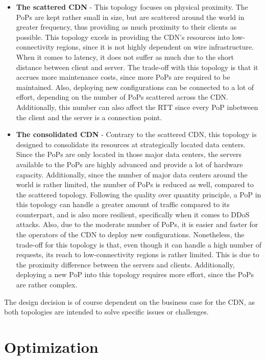 \begin{itemize}
	\item \textbf{The scattered CDN} - This topology focuses on physical proximity. The PoPs are kept rather small in size, but are scattered around the world in greater frequency, thus providing as much proximity to their clients as possible. This topology excels in providing the CDN's resources into low-connectivity regions, since it is not highly dependent on wire infrastructure. When it comes to latency, it does not suffer as much due to the short distance between client and server. The trade-off with this topology is that it accrues more maintenance costs, since more PoPs are required to be maintained. Also, deploying new configurations can be connected to a lot of effort, depending on the number of PoPs scattered across the CDN. 
	Additionally, this number can also affect the RTT since every PoP inbetween the client and the server is a connection point.
	
	\item \textbf{The consolidated CDN} - Contrary to the scattered CDN, this topology is designed to consolidate its resources at strategically located data centers. Since the PoPs are only located in those major data centers, the servers available to the PoPs are highly advanced and provide a lot of hardware capacity. Additionally, since the number of major data centers around the world is rather limited, the number of PoPs is reduced as well, compared to the scattered topology. Following the quality over quantity principle, a PoP in this topology can handle a greater amount of traffic compared to its counterpart, and is also more resilient, specifically when it comes to DDoS attacks. Also, due to the moderate number of PoPs, it is easier and faster for the operators of the CDN to deploy new configurations.
	Nonetheless, the trade-off for this topology is that, even though it can handle a high number of requests, its reach to low-connectivity regions is rather limited. This is due to the proximity difference between the servers and clients. Additionally, deploying a new PoP into this topology requires more effort, since the PoPs are rather complex.	
\end{itemize}

The design decision is of course dependent on the business case for the CDN, as both topologies are intended to solve specific issues or challenges. \cite{cdn_architecture} 

\section{Optimization}


